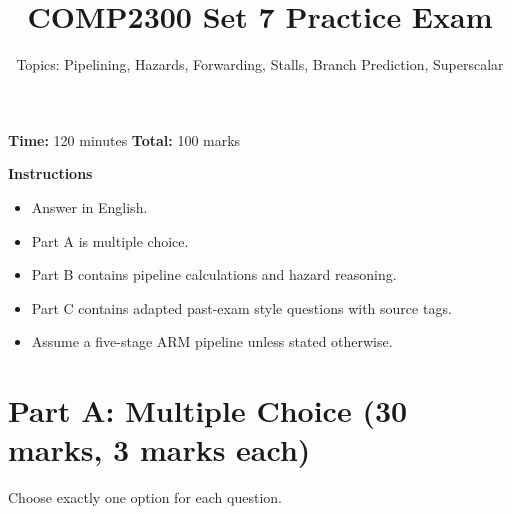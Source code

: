 \documentclass[11pt]{article}
\title{COMP2300 Set 7 Practice Exam}
\author{Topics: Pipelining, Hazards, Forwarding, Stalls, Branch Prediction, Superscalar}
\date{}
\begin{document}
\maketitle

\noindent\textbf{Time:} 120 minutes \hfill
\textbf{Total:} 100 marks

\vspace{0.5em}
\noindent\textbf{Instructions}
\begin{itemize}[leftmargin=1.5em]
  \item Answer in English.
  \item Part A is multiple choice.
  \item Part B contains pipeline calculations and hazard reasoning.
  \item Part C contains adapted past-exam style questions with source tags.
  \item Assume a five-stage ARM pipeline unless stated otherwise.
\end{itemize}

\section*{Part A: Multiple Choice (30 marks, 3 marks each)}
Choose exactly one option for each question.
\end{document}
